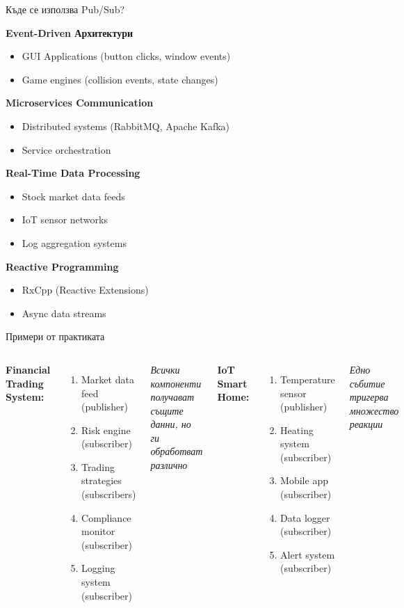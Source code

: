 \documentclass[aspectratio=169]{beamer}
\begin{document}
\begin{frame}{Къде се използва Pub/Sub?}

\textbf{Event-Driven Архитектури}
\begin{itemize}
    \item GUI Applications (button clicks, window events)
    \item Game engines (collision events, state changes)
\end{itemize}

\textbf{Microservices Communication}
\begin{itemize}
    \item Distributed systems (RabbitMQ, Apache Kafka)
    \item Service orchestration
\end{itemize}

\textbf{Real-Time Data Processing}
\begin{itemize}
    \item Stock market data feeds
    \item IoT sensor networks
    \item Log aggregation systems
\end{itemize}

\textbf{Reactive Programming}
\begin{itemize}
    \item RxCpp (Reactive Extensions)
    \item Async data streams
\end{itemize}
\end{frame}

\begin{frame}{Примери от практиката}
\begin{columns}
\textbf{Financial Trading System:}
\begin{enumerate}
    \item Market data feed (publisher)
    \item Risk engine (subscriber)
    \item Trading strategies (subscribers)
    \item Compliance monitor (subscriber)
    \item Logging system (subscriber)
\end{enumerate}

\textit{Всички компоненти получават същите данни, но ги обработват различно}

\textbf{IoT Smart Home:}
\begin{enumerate}
    \item Temperature sensor (publisher)
    \item Heating system (subscriber)
    \item Mobile app (subscriber)
    \item Data logger (subscriber)
    \item Alert system (subscriber)
\end{enumerate}

\textit{Едно събитие тригерва множество реакции}
\end{columns}
\end{frame}
\end{document}
